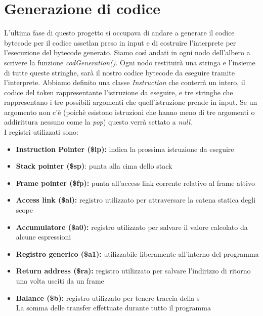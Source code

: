 \documentclass[12pt, a4paper]{report}
\begin{document}
\chapter{Generazione di codice}
L'ultima fase di questo progetto si occupava di andare a generare il codice bytecode per il codice assetlan preso in input e di costruire l'interprete per l'esecuzione del bytecode generato. Siamo così andati in ogni nodo dell'albero a scrivere la funzione \emph{codGeneration()}. Ogni nodo restituirà una stringa e l'insieme di tutte queste stringhe, sarà il nostro codice bytecode da eseguire tramite l'interprete. Abbiamo definito una classe \emph{Instruction} che conterrà un intero, il codice del token rappresentante l'istruzione da eseguire, e tre stringhe che rappresentano i tre possibili argomenti che quell'istruzione prende in input. Se un argomento non c'è (poichè esistono istruzioni che hanno meno di tre argomenti o addirittura nessuno come la \emph{pop}) questo verrà settato a \emph{null}.\\
I registri utilizzati sono:
\begin{itemize}
    \item \textbf{Instruction Pointer (\$ip):} indica la prossima istruzione da eseguire
    \item \textbf{Stack pointer (\$sp)}: punta alla cima dello stack
    \item \textbf{Frame pointer (\$fp):} punta all’access link corrente relativo al frame attivo
    \item \textbf{Access link (\$al):} registro utilizzato per attraversare la catena statica degli scope
    \item \textbf{Accumulatore (\$a0):} registro utilizzato per salvare il valore calcolato da alcune espressioni
    \item \textbf{Registro generico (\$a1):} utilizzabile liberamente all’interno del programma
    \item \textbf{Return address (\$ra):} registro utilizzato per salvare l’indirizzo di ritorno una volta usciti da un
    frame
    \item \textbf{Balance (\$b):} registro utilizzato per tenere traccia della s\\
    La somma delle transfer effettuate durante tutto il programma 
\end{itemize}
\end{document}
